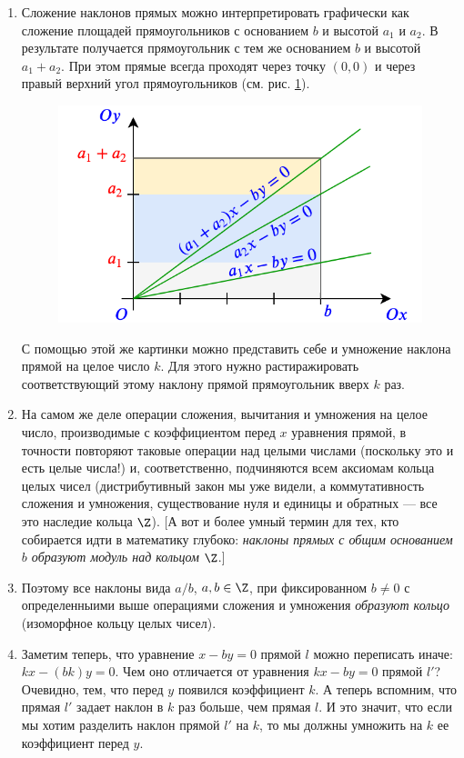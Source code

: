 \begin{enumerate}
\item Сложение наклонов прямых можно интерпретировать графически как сложение площадей прямоугольников с основанием $b$ и высотой $a_1$ и $a_2$. В результате получается прямоугольник с тем же основанием $b$ и высотой $a_1+a_2$. При этом прямые всегда проходят через точку $(0,0)$ и через правый верхний угол прямоугольников (см. рис. \ref{linesum}).
\begin{figure}
\begin{center}
\includegraphics[scale=0.5]{linesum.png}
\end{center}
\caption{}\label{linesum}
\end{figure}
С помощью этой же картинки можно представить себе и умножение наклона прямой на целое число $k$. Для этого нужно растиражировать соответствующий этому наклону прямой прямоугольник вверх $k$ раз.

\item На самом же деле операции сложения, вычитания и умножения на целое число, производимые с коэффициентом перед $x$ уравнения прямой, в точности повторяют таковые операции над целыми числами (поскольку это и есть целые числа!) и, соответственно, подчиняются всем аксиомам кольца целых чисел (дистрибутивный закон мы уже видели, а коммутативность сложения и умножения, существование нуля и единицы и обратных --- все это наследие кольца $\Z$). [А вот и более умный термин для тех, кто собирается идти в математику глубоко: \textit{наклоны прямых с общим основанием $b$ образуют модуль над кольцом} $\Z$.]
\item Поэтому все наклоны вида $a/b$, $a,b\in\Z$, при фиксированном $b\ne 0$ с определенныими выше операциями сложения и умножения \textit{образуют кольцо} (изоморфное кольцу целых чисел). 
\item Заметим теперь, что уравнение $x-by=0$ прямой $l$ можно переписать иначе: $kx-(bk)y=0$. Чем оно отличается от уравнения $kx-by=0$ прямой $l'$? Очевидно, тем, что перед $y$ появился коэффициент $k$. А теперь вспомним, что прямая $l'$ задает наклон в $k$ раз больше, чем прямая $l$. И это значит, что если мы хотим разделить наклон прямой $l'$ на $k$, то мы должны умножить на $k$ ее коэффициент перед $y$.


\end{enumerate}
